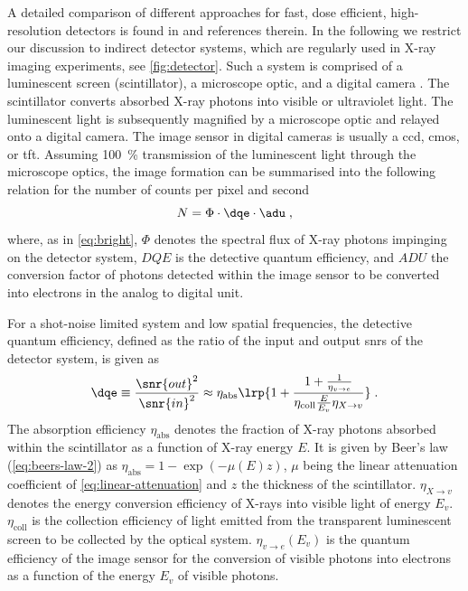 \documentclass[
twoside,
openright,
titlepage,
numbers=noenddot,
headinclude,
fleqn,
a4paper,
footinclude=true,
cleardoublepage=empty,
abstractoff,
BCOR=5mm,
paper=a4,
fontsize=11pt,
british,ngerman,american,
]{scrreprt}
\begin{document}
A detailed comparison of different approaches for fast, dose
efficient, high-resolution detectors is found in \cite{Martin2006} and
references therein.  In the following we restrict our discussion to
indirect detector systems, which are regularly used in X-ray imaging
experiments, see \cref{fig:detector}.  Such a system is comprised of a
luminescent screen (scintillator), a microscope optic, and a digital
camera \cite{Koch1998}.  The scintillator converts absorbed X-ray
photons into visible or ultraviolet light.  The luminescent light is
subsequently magnified by a microscope optic and relayed onto a
digital camera.  The image sensor in digital cameras is usually a
\ac{ccd}, \ac{cmos}, or \ac{tft}.  Assuming \SI{100}{\percent}
transmission of the luminescent light through the microscope optics,
the image formation can be summarised into the following relation for
the number of counts per pixel and second 
\begin{equation}
  \label{eq:photon-counts}
  N = \Phi \cdot \dqe \cdot \adu \;,
\end{equation}
where, as in \cref{eq:bright}, $\Phi$ denotes the spectral flux of
X-ray photons impinging on the detector system, $DQE$ is the detective
quantum efficiency, and $ADU$  the conversion factor of photons
detected within the image sensor to be converted into electrons in the
analog to digital unit.

For a shot-noise limited system and low spatial frequencies, the
detective quantum efficiency, defined as the ratio of the input and
output \acfp{snr} of the detector system, is given as
\cite{Koch1998,Martin2006}
\begin{equation}
  \label{eq:dqe}
  \dqe \equiv \frac{\snr{out}^2}{\snr{in}^2} 
  \approx \eta_{\mathrm{abs}} 
  \lrp{ 1 + \frac{1+\frac{1}{\eta_{v\to e}}}
    {\eta_{\mathrm{coll}}\frac{E}{E_v}\eta_{X\to v} } }  \;.
\end{equation}
The absorption efficiency $\eta_{\mathrm{abs}}$ denotes the fraction
of X-ray photons absorbed within the scintillator as a function of
X-ray energy $E$.  It is given by Beer's law
(\cref{eq:beers-law-2}) as $\eta_{\mathrm{abs}}=1-\exp(-\mu(E)z)$,
$\mu$ being the linear attenuation coefficient of
\cref{eq:linear-attenuation} and $z$ the thickness of the
scintillator.  $\eta_{X\to v}$ denotes the energy conversion
efficiency of X-rays into visible light of energy $E_v$.
$\eta_{\mathrm{coll}}$ is the collection efficiency of light emitted
from the transparent luminescent screen to be collected by the optical
system.  $\eta_{v\to e}(E_v)$ is the quantum efficiency of the image
sensor for the conversion of visible photons into electrons as a
function of the energy $E_v$ of visible photons.
\end{document}
